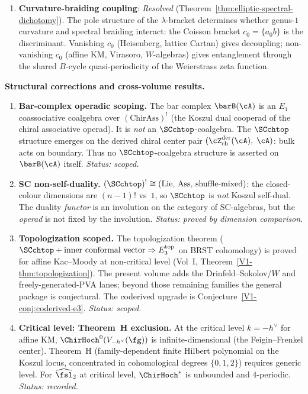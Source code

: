 \begin{enumerate}
\item \textbf{Curvature-braiding coupling}: \emph{Resolved} (Theorem~\ref{thm:elliptic-spectral-dichotomy}). The pole structure of the $\lambda$-bracket determines whether genus-$1$ curvature and spectral braiding interact: the Coisson bracket $c_0 = \{a{}_0 b\}$ is the discriminant. Vanishing $c_0$ (Heisenberg, lattice Cartan) gives decoupling; non-vanishing $c_0$ (affine KM, Virasoro, $W$-algebras) gives entanglement through the shared $B$-cycle quasi-periodicity of the Weierstrass zeta function.
\end{enumerate}

\medskip
\noindent\textbf{Structural corrections and cross-volume results.}

\begin{enumerate}[resume]

\item \textbf{Bar-complex operadic scoping.}
 The bar complex $\barB(\cA)$ is an $E_1$ coassociative coalgebra over
 $(\mathrm{ChirAss})^!$ (the Koszul dual cooperad of the chiral
 associative operad). It is \emph{not} an $\SCchtop$-coalgebra.
 The $\SCchtop$ structure emerges on the derived chiral center pair
 $(\cZ^{\mathrm{der}}_{\mathrm{ch}}(\cA),\; \cA)$: bulk acts on
 boundary. Thus no $\SCchtop$-coalgebra structure is asserted on
 $\barB(\cA)$ itself.
 \emph{Status: scoped.}

\item \textbf{SC non-self-duality.}
 $(\SCchtop)^! \cong (\mathrm{Lie},\, \mathrm{Ass},\,
 \text{shuffle-mixed})$: the closed-colour dimensions are
 $(n{-}1)!$ vs~$1$, so $\SCchtop$ is \emph{not} Koszul self-dual.
 The duality \emph{functor} is an involution on the category of
 SC-algebras, but the \emph{operad} is not fixed by the involution.
 \emph{Status: proved by dimension comparison.}

\item \textbf{Topologization scoped.}
 The topologization theorem
 ($\SCchtop + \text{inner conformal vector} \Rightarrow E_3^{\mathrm{top}}$
 on BRST cohomology)
 is proved for affine Kac--Moody at non-critical level
 (Vol~I, Theorem~\ref*{V1-thm:topologization}).
 The present volume adds the Drinfeld--Sokolov/$W$ and
 freely-generated-PVA lanes; beyond those remaining families the
 general package is conjectural. The coderived upgrade is
 Conjecture~\ref*{V1-conj:coderived-e3}.
 \emph{Status: scoped.}

\item \textbf{Critical level: Theorem~H exclusion.}
 At the critical level $k = -h^\vee$ for affine KM,
 $\ChirHoch^0(V_{-h^\vee}(\fg))$ is infinite-dimensional
 (the Feigin--Frenkel center). Theorem~H (family-dependent finite
 Hilbert polynomial on the Koszul locus, concentrated in
 cohomological degrees $\{0,1,2\}$) requires generic level. For
 $\widehat{\fsl}_2$ at critical level, $\ChirHoch^*$ is
 unbounded and $4$-periodic.
 \emph{Status: recorded.}


\end{enumerate}

